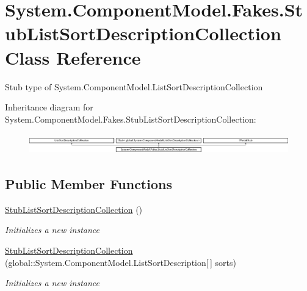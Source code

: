 \hypertarget{class_system_1_1_component_model_1_1_fakes_1_1_stub_list_sort_description_collection}{\section{System.\-Component\-Model.\-Fakes.\-Stub\-List\-Sort\-Description\-Collection Class Reference}
\label{class_system_1_1_component_model_1_1_fakes_1_1_stub_list_sort_description_collection}
}


Stub type of System.\-Component\-Model.\-List\-Sort\-Description\-Collection 


Inheritance diagram for System.\-Component\-Model.\-Fakes.\-Stub\-List\-Sort\-Description\-Collection\-:\begin{figure}[H]
\begin{center}
\leavevmode
\includegraphics[height=0.893142cm]{class_system_1_1_component_model_1_1_fakes_1_1_stub_list_sort_description_collection}
\end{center}
\end{figure}
\subsection*{Public Member Functions}
\begin{DoxyCompactItemize}
\item 
\hyperlink{class_system_1_1_component_model_1_1_fakes_1_1_stub_list_sort_description_collection_ad93f1bedd336109f78f31cb097366eb0}{Stub\-List\-Sort\-Description\-Collection} ()
\begin{DoxyCompactList}\small\item\em Initializes a new instance\end{DoxyCompactList}\item 
\hyperlink{class_system_1_1_component_model_1_1_fakes_1_1_stub_list_sort_description_collection_abfaa839dd0ca5bbb728f81e96a0ceafa}{Stub\-List\-Sort\-Description\-Collection} (global\-::\-System.\-Component\-Model.\-List\-Sort\-Description\mbox{[}$\,$\mbox{]} sorts)
\begin{DoxyCompactList}\small\item\em Initializes a new instance\end{DoxyCompactList}\end{DoxyCompactItemize}
